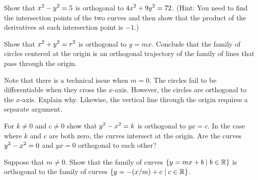 \begin{exercises}
 \exercise Show that $\displaystyle x^2 -y^2 =5$ is orthogonal to $\displaystyle 4x^2 +9y^2
 =72$. (Hint: You need to find the intersection points of the two
 curves and then show that the product of the derivatives at each
 intersection point is $-1$.)

\exercise Show that $\displaystyle x^2 +y^2 = r^2$ is orthogonal to
$y=mx$. Conclude that the family of circles centered at the origin is
an orthogonal trajectory of the family of lines that pass through the
origin.

Note that there is a technical issue when $m=0$. The circles fail to
be differentiable when they cross the $x$-axis. However, the circles
are orthogonal to the $x$-axis. Explain why. Likewise, the vertical
line through the origin requires a separate argument.

\exercise For $k\not= 0$ and $c \neq 0$ show that $\displaystyle y^2 -x^2 =k$ is orthogonal to
$yx =c$. In the case where $k$ and $c$ are both zero, the curves
  intersect at the origin. Are the curves $\displaystyle y^2 -x^2 =0$ and $yx=0$
  orthogonal to each other?

\exercise Suppose that $m\neq 0$. Show that the family of curves
$\displaystyle \{y=mx+b \mid b\in \mathbb{R} \}$ is orthogonal to the
family of curves $\displaystyle \{y=-(x/m)+c \mid c \in \mathbb{R}\}$.

\end{exercises}
